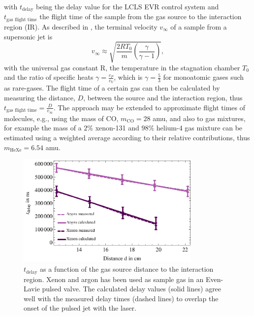 with $t_{\text{delay}}$ being the delay value for the LCLS EVR control system and $t_{\text{gas flight time}}$ the flight time of the sample from the gas source to the interaction region (IR). As described in \citep{Miller-1988-Oxford}, the terminal velocity $v_{\infty}$ of a sample from a supersonic jet is
\begin{equation}
 v_{\infty} \approx \sqrt{\frac{2 R T_{0}}{m} \left(\frac{\gamma}{\gamma - 1}\right)},
\label{eqn:terminal-velocity}
\end{equation}
with the universal gas constant R, the temperature in the stagnation chamber $T_{0}$ and the ratio of specific heats $\gamma = \frac{c_{P}}{c_{V}}$, which is $\gamma = \frac{5}{3}$ for monoatomic gases such as rare-gases. The flight time of a certain gas can then be calculated by measuring the distance, $D$, between the source and the interaction region, thus $t_{\text{gas flight time}}=\frac{D}{v_{\infty}}$. The approach may be extended to approximate flight times of molecules, e.g., using the mass of CO, $m_{\text{CO}}=28$ amu, and also to gas mixtures, for example the mass of a $2\%$ xenon-131 and $98\%$ helium-4 gas mixture can be estimated using a weighted average according to their relative contributions, thus  $m_{\text{HeXe}} = 6.54$ amu.\\[1\baselineskip]
\begin{figure}
	\centering
		\includegraphics[width=0.80\textwidth]{images/gas-jet-flight-times.eps}
	\caption[Event receiver time delay at LCLS for supersonic gas jets.]{$t_{\text{delay}}$ as a function of the gas source distance to the interaction region. Xenon and argon has been used as sample gas in an Even-Lavie pulsed valve. The calculated delay values (solid lines) agree well with the measured delay times (dashed lines) to overlap the onset of the pulsed jet with the laser.}
	\label{fig:LCLS-delay-data}
\end{figure}
